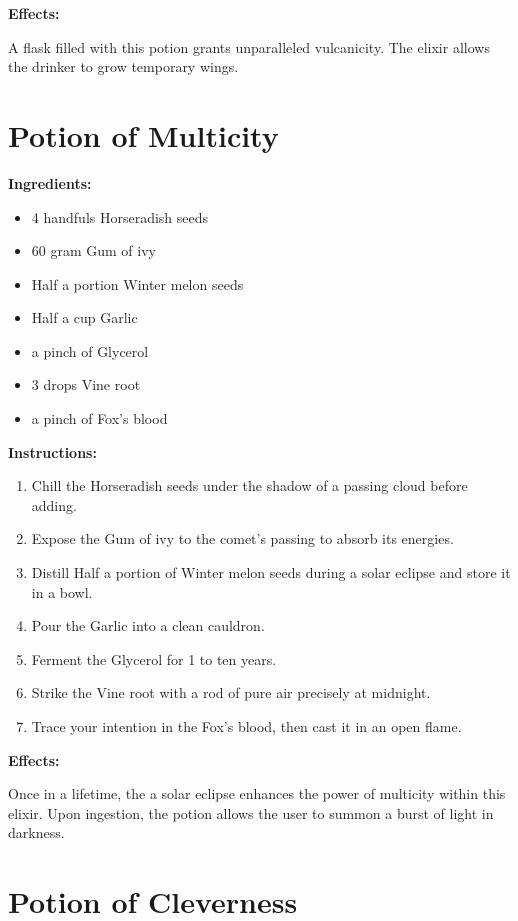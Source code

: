 \documentclass{article}
\begin{document}
\textbf{Effects:}

A flask filled with this potion grants unparalleled vulcanicity. The elixir allows the drinker to grow temporary wings.

\newpage
\section*{Potion of Multicity}

\textbf{Ingredients:}

\begin{itemize}
  \item 4 handfuls Horseradish seeds
  \item 60 gram Gum of ivy
  \item Half a portion Winter melon seeds
  \item Half a cup Garlic
  \item a pinch of Glycerol
  \item 3 drops Vine root
  \item a pinch of Fox's blood
\end{itemize}

\textbf{Instructions:}

\begin{enumerate}
  \item Chill the Horseradish seeds under the shadow of a passing cloud before adding.
  \item Expose the Gum of ivy to the comet’s passing to absorb its energies.
  \item Distill Half a portion of Winter melon seeds during a solar eclipse and store it in a bowl.
  \item Pour the Garlic into a clean cauldron.
  \item Ferment the Glycerol for 1 to ten years.
  \item Strike the Vine root with a rod of pure air precisely at midnight.
  \item Trace your intention in the Fox's blood, then cast it in an open flame.
\end{enumerate}

\textbf{Effects:}

Once in a lifetime, the a solar eclipse enhances the power of multicity within this elixir. Upon ingestion, the potion allows the user to summon a burst of light in darkness.

\newpage
\section*{Potion of Cleverness}
\end{document}
